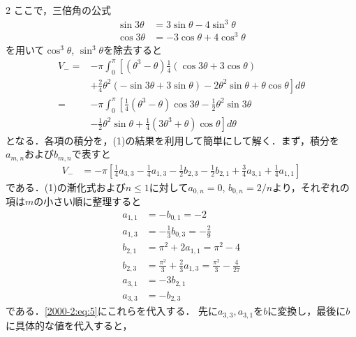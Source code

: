 \documentclass[../../main.tex]{subfiles}
\begin{document}
\begin{multicols}{2}
  ここで，三倍角の公式
  \begin{align*}
    \sin 3\theta & = 3\sin\theta - 4 \sin^3\theta \\
    \cos 3\theta & =-3\cos\theta + 4 \cos^3\theta
  \end{align*}
  を用いて$\cos^3\theta$, $\sin^3\theta$を除去すると
  \begin{align*}
    V_{-}
    = & -\pi \int_{0}^{\pi} \left[
    \left(\theta^3-\theta\right)\frac{1}{4}\left(\cos 3\theta + 3\cos\theta \right)\right. \\
      & + \left. \frac{2}{4}\theta^2\left(-\sin 3\theta + 3\sin\theta \right)
    -2 \theta^2\sin\theta + \theta \cos\theta \right]  d\theta                             \\
    = & -\pi \int_{0}^{\pi} \left[
      \frac{1}{4}\left(\theta^3-\theta\right)\cos 3\theta
    -\frac{1}{2}\theta^2\sin 3\theta \right.                                               \\
      & \left. -\frac{1}{2}\theta^2\sin\theta
      +\frac{1}{4} \left(3\theta^3+\theta\right) \cos\theta \right]  d\theta
  \end{align*}
  となる．各項の積分を，(1)の結果を利用して簡単にして解く．まず，積分を$a_{m,n}$および$b_{m,n}$で表すと
  \begin{align}
    V_{-}
     & = -\pi \left[ \frac{1}{4}a_{3,3}-\frac{1}{4}a_{1,3} - \frac{1}{2}b_{2,3} -\frac{1}{2}b_{2,1}+\frac{3}{4}a_{3,1}+\frac{1}{4}a_{1,1} \right] \label{2000-2:eq:5}
  \end{align}
  である．(1)の漸化式および$n\le 1$に対して$a_{0,n}=0$, $b_{0,n}=2/n$より，それぞれの項は$m$の小さい順に整理すると
  \begin{align*}
    a_{1,1} & = - b_{0,1} = -2                                                         \\
    a_{1,3} & = -\frac{1}{3} b_{0,3} = -\frac{2}{9}                                    \\
    b_{2,1} & = \pi^2 + 2 a_{1,1} = \pi^2 - 4                                          \\
    b_{2,3} & = \frac{\pi^2}{3} + \frac{2}{3} a_{1,3} = \frac{\pi^2}{3} - \frac{4}{27} \\
    a_{3,1} & = - 3 b_{2,1}                                                            \\
    a_{3,3} & = -b_{2,3}
  \end{align*}
  である．\cref{2000-2:eq:5}にこれらを代入する．
  先に$a_{3,3}, a_{3,1}$を$b$に変換し，最後に$b$に具体的な値を代入すると，

\end{multicols}
\end{document}
